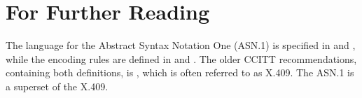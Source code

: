 \section	{For Further Reading}
The language for the Abstract Syntax Notation One (ASN.1) is specified in
\cite{ISO.PP.Syntax} and \cite{CCITT.PP.Syntax},
while the encoding rules are defined in \cite{ISO.PP.Encoding} and
\cite{CCITT.PP.Syntax}.
The older {} CCITT recommendations,
containing both definitions,
is \cite{MHS.notation},
which is often referred to as X.409.
The ASN.1 is a superset of the X.409.


